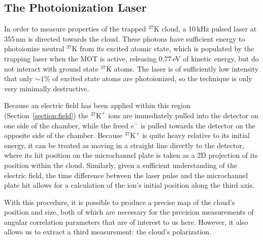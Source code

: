 \subsection{The Photoionization Laser}
\label{cloud}
\label{photoions}
In order to measure properties of the trapped $^{37}\textrm{K}$ cloud, a 10\,kHz pulsed laser at 355\,nm is directed towards the cloud.  These photons have sufficient energy to photoionize neutral $^{37}\textrm{K}$ from its excited atomic state, which is populated by the trapping laser when the MOT is active, releasing 0.77\,eV of kinetic energy, but do not interact with ground state $^{37}\textrm{K}$ atoms.  The laser is of sufficiently low intensity that only $\sim 1\%$ of excited state atoms are photoionized, so the technique is only very minimally destructive.

Because an electric field has been applied within this region (Section~\ref{section:field})
the $^{37}\textrm{K}^+$ ions are immediately pulled into the detector on one side of the chamber, while the freed $e^-$ is pulled towards the detector on the opposite side of the chamber.  Because  $^{37}\textrm{K}^+$ is quite heavy relative to its initial energy, it can be treated as moving in a straight line directly to the detector, where its hit position on the microchannel plate is taken as a 2D projection of its position within the cloud.  Similarly, given a sufficient understanding of the electric field, the time difference between the laser pulse and the microchannel plate hit allows for a calculation of the ion's initial position along the third axis.  



With this procedure, it is possible to produce a precise map of the cloud's position and size, both of which are necessary for the precision measurements of angular correlation parameters that are of interest to us here.  However, it also allows us to extract a third measurement:  the cloud's polarization.

